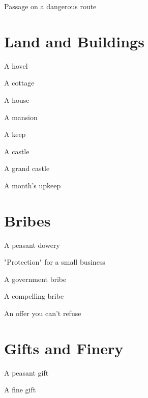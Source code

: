 Passage on a dangerous route	 

 
\section{Land and Buildings}    
 

A hovel	 

 

A cottage	 

 

A house	 

 

A mansion	 

 

A keep	 

 

A castle	 

 

A grand castle	 

 

A month's upkeep	 

 
\section{Bribes}   
 

A peasant dowery	 

 

"Protection" for a small business	 

 

A government bribe	 

 

A compelling bribe	 

 

An offer you can't refuse	 

 
\section{Gifts and Finery}    
 

A peasant gift	 

 

A fine gift	 

